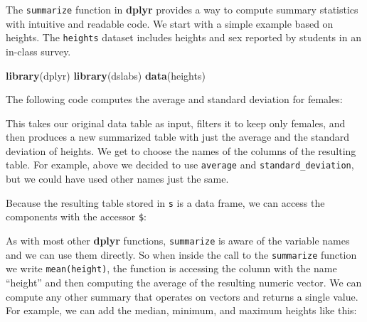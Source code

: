 \documentclass[
]{krantz}
\newenvironment{Shaded}{\begin{snugshade}}{\end{snugshade}}
\newcommand{\CommentTok}[1]{\textcolor[rgb]{0.37,0.37,0.37}{\textit{#1}}}
\newcommand{\DataTypeTok}[1]{\textcolor[rgb]{0.27,0.27,0.27}{#1}}
\newcommand{\KeywordTok}[1]{\textcolor[rgb]{0.27,0.27,0.27}{\textbf{#1}}}
\newcommand{\NormalTok}[1]{#1}
\newcommand{\OperatorTok}[1]{\textcolor[rgb]{0.43,0.43,0.43}{\textbf{#1}}}
\newcommand{\StringTok}[1]{\textcolor[rgb]{0.5,0.5,0.5}{#1}}
\begin{document}
The \texttt{summarize} function in \textbf{dplyr} provides a way to compute summary statistics with intuitive and readable code. We start with a simple example based on heights. The \texttt{heights} dataset includes heights and sex reported by students in an in-class survey.

\begin{Shaded}
\begin{Highlighting}[]
\KeywordTok{library}\NormalTok{(dplyr)}
\KeywordTok{library}\NormalTok{(dslabs)}
\KeywordTok{data}\NormalTok{(heights)}
\end{Highlighting}
\end{Shaded}

The following code computes the average and standard deviation for females:

\begin{Shaded}
\end{Shaded}

This takes our original data table as input, filters it to keep only females, and then produces a new summarized table with just the average and the standard deviation of heights. We get to choose the names of the columns of the resulting table. For example, above we decided to use \texttt{average} and \texttt{standard\_deviation}, but we could have used other names just the same.

Because the resulting table stored in \texttt{s} is a data frame, we can access the components with the accessor \texttt{\$}:

\begin{Shaded}
\end{Shaded}

As with most other \textbf{dplyr} functions, \texttt{summarize} is aware of the variable names and we can use them directly. So when inside the call to the \texttt{summarize} function we write \texttt{mean(height)}, the function is accessing the column with the name ``height'' and then computing the average of the resulting numeric vector. We can compute any other summary that operates on vectors and returns a single value. For example, we can add the median, minimum, and maximum heights like this:
\end{document}
